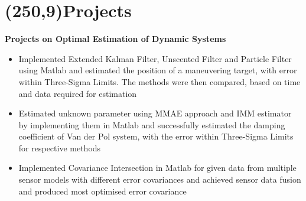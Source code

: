 \documentclass[10pt,a4paper]{extarticle}
\begin{document}
\section*{\colorbox{gray!10}{\makebox(250,9){\textcolor{blue!65}{Projects\hfill}}}}
\textbf{Projects on Optimal Estimation of Dynamic Systems}
\vspace{-0.4em}
\begin{itemize}[leftmargin = 0.6cm]
\setlength\itemsep{-0.2em}
\item Implemented Extended Kalman Filter, Unscented Filter and Particle Filter using Matlab and estimated the position of a maneuvering target, with error within Three-Sigma Limits. The methods were then compared, based on time and data required for estimation
\item Estimated unknown parameter using MMAE approach and IMM estimator by implementing them in Matlab and successfully estimated the damping coefficient of Van der Pol system, with the error within Three-Sigma Limits for respective methods
\item Implemented Covariance Intersection in Matlab for given data from multiple sensor models with different error covariances and achieved sensor data fusion and produced most optimised error covariance
\end{itemize}
\end{document}
